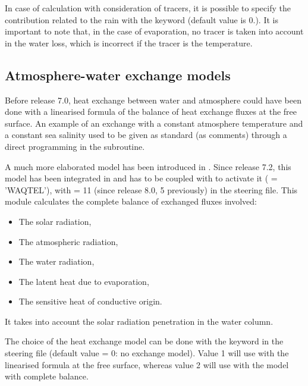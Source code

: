 In case of calculation with consideration of tracers, it is possible to specify
the contribution related to the rain with the keyword  (default value is 0.). It is important to note that, in the case
of evaporation, no tracer is taken into account in the water loss, which is
incorrect if the tracer is the temperature.

\subsection{Atmosphere-water exchange models}

Before release 7.0, heat exchange between water and atmosphere could have been
done with a linearised formula of the balance of heat exchange fluxes at the
free surface. An example of an exchange with a constant atmosphere temperature
and a constant sea salinity used to be given as standard (as comments) through a
direct programming in the  subroutine.

A much more elaborated model has been introduced in .
Since release 7.2, this model has been integrated in \waqtel and
 has to be coupled with \waqtel to activate it
( = 'WAQTEL'), with
 = 11 (since release 8.0, 5 previously)
in the \waqtel steering file.
This module calculates the complete balance of exchanged fluxes involved:

\begin{itemize}
\item  The solar radiation,

\item  The atmospheric radiation,

\item  The water radiation,

\item  The latent heat due to evaporation,

\item  The sensitive heat of conductive origin.
\end{itemize}

It takes into account the solar radiation penetration in the water column.

The choice of the heat exchange model can be done with the keyword
 in the \waqtel steering file
(default value = 0: no exchange
model). Value 1 will use with the linearised formula at the free surface,
whereas value 2 will use with the model with complete balance.

